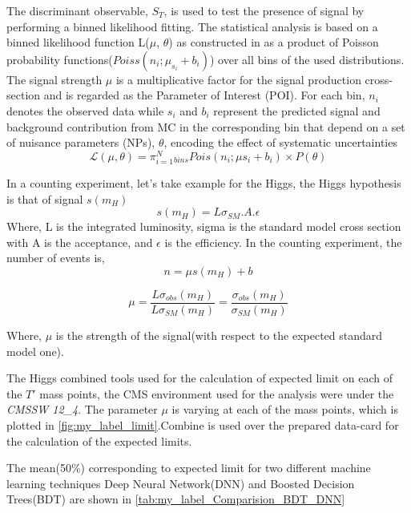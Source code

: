 The discriminant observable, $S_T$, is used to test the presence of signal by performing
a binned likelihood fitting. The statistical analysis is based on a binned likelihood function L($\mu$, $\theta$) as constructed in  as a product of Poisson probability functions($Poiss(n_i; \mu_{s_i} + b_i)$) over all bins of the used distributions. The signal strength $\mu$ is a multiplicative factor for the signal production cross-section and is regarded as the Parameter of
Interest (POI). For each bin, $n_i$ denotes the observed data while $s_i$ and $b_i$ represent the predicted signal and background contribution from MC in the corresponding bin that depend
on a set of nuisance parameters (NPs), $\theta$, encoding the effect of systematic uncertainties
\begin{equation}
    \mathcal{L(\mu, \theta)} = \pi_{i=1}^N_{bins}Pois(n_i;\mu s_i +b_i)\times P(\theta) 
\end{equation}

In a counting experiment, let's take example for the Higgs, the Higgs hypothesis is that of signal $s(m_H)$\\
\begin{equation*}
    s(m_H) = L\sigma_{SM}.A.\epsilon
\end{equation*}
Where, L is the integrated luminosity, sigma is the standard model cross section  with A is the acceptance, and $\epsilon$ is the efficiency. 
In the counting experiment, the number of events is,
\begin{equation*}
    n = \mu s(m_H) + b
\end{equation*}

\begin{equation}\label{eq:my_eqn_12}
    \mu = \frac{L \sigma_{obs}(m_H)}{L \sigma_{SM}(m_H)} = \frac{\sigma_{obs}(m_H)}{\sigma_{SM}(m_H)}
\end{equation}

Where, $\mu$ is the strength of the signal(with respect to the expected standard model one).




The Higgs combined tools used for the calculation of expected limit on each of the $T'$ mass points, the CMS environment used for the analysis were under the \textit{CMSSW 12\_4}\cite{ml_70}. The parameter $\mu$ is varying at each of the mass points, which is plotted in \autoref{fig:my_label_limit}.Combine is used over the prepared data-card for the calculation of the expected limits.




The mean(50\%) corresponding to expected limit for two different machine learning techniques Deep Neural Network(DNN) and Boosted Decision Trees(BDT) are shown in \autoref{tab:my_label_Comparision_BDT_DNN}

